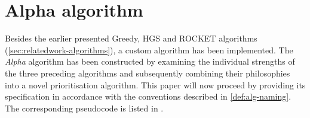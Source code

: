 
\section{Alpha algorithm}
\label{sec:velocity-alpha}

Besides the earlier presented Greedy, HGS and ROCKET algorithms (\cref{sec:relatedwork-algorithms}), a custom algorithm has been implemented. The \emph{Alpha} algorithm has been constructed by examining the individual strengths of the three preceding algorithms and subsequently combining their philosophies into a novel prioritisation algorithm. This paper will now proceed by providing its specification in accordance with the conventions described in \cref{def:alg-naming}. The corresponding pseudocode is listed in .\\

